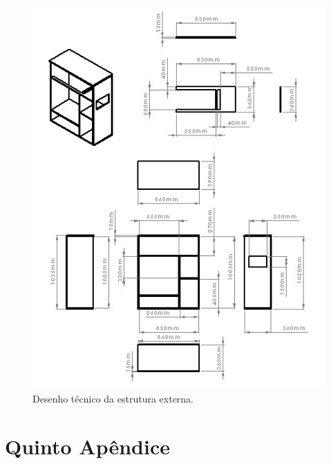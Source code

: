 \begin{apendicesenv}
\label{app:estante}
\begin{figure}[H]
\centering
\includegraphics[width=\textwidth]{figuras/desenho_tecnico_estante}
\caption{Desenho técnico da estrutura externa.}
\label{fig:desenho_estante}
\end{figure}

\chapter{Quinto Apêndice}

\label{app:visao_explodida}


\end{apendicesenv}
